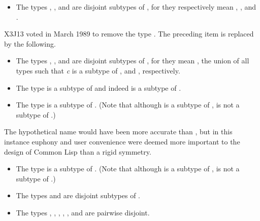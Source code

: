 \begin{obsolete}
\begin{itemize}
\item
The types , , and
 are disjoint subtypes of , for they
respectively mean , ,
and .
\end{itemize}
\end{obsolete}

\begin{newer}
X3J13 voted in March 1989  to remove the type .
The preceding item is replaced by the following.
\begin{itemize}
\item
The types , , and
 are disjoint subtypes of , for they
mean , the union of all types
 such that {\it c} is a subtype of ,
and , respectively.
\end{itemize}
\end{newer}

\begin{itemize}
\item
The type  is a subtype of  and indeed
is a subtype of .

\item
The type  is a subtype of .
(Note that although  is a subtype of ,
 is not a subtype of .)
\end{itemize}

\beforenoterule
\begin{rationale}
The hypothetical name  would have been more accurate than
, but in this instance euphony and
user convenience were deemed more important to the design
of Common Lisp than a rigid symmetry.
\end{rationale}
\afternoterule

\begin{itemize}
\item
The type  is a subtype of .
(Note that although  is a subtype of ,
 is not a subtype of .)

\item
The types  and  are disjoint subtypes of .

\item
The types , , , ,
, and  are pairwise disjoint.
\end{itemize}

